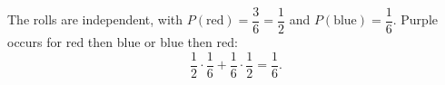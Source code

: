 The rolls are independent, with $P(\text{red})=\dfrac{3}{6}=\dfrac{1}{2}$ and $P(\text{blue})=\dfrac{1}{6}$. Purple occurs for red then blue or blue then red:
\[
\dfrac{1}{2}\cdot\dfrac{1}{6}+\dfrac{1}{6}\cdot\dfrac{1}{2}=\boxed{\dfrac{1}{6}}.
\]
